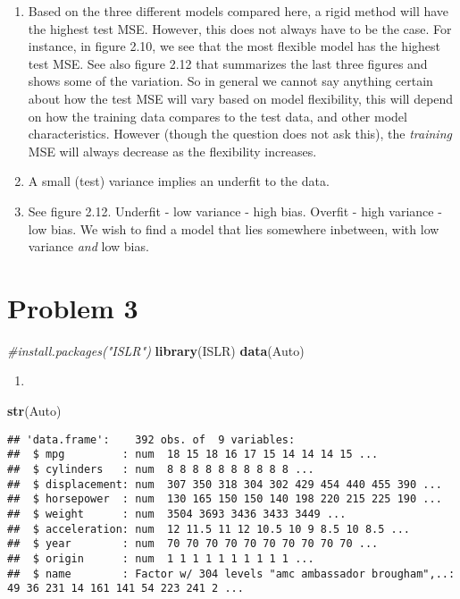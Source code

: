 \documentclass[
]{article}
\newenvironment{Shaded}{\begin{snugshade}}{\end{snugshade}}
\newcommand{\CommentTok}[1]{\textcolor[rgb]{0.56,0.35,0.01}{\textit{#1}}}
\newcommand{\FunctionTok}[1]{\textcolor[rgb]{0.13,0.29,0.53}{\textbf{#1}}}
\newcommand{\NormalTok}[1]{#1}
\providecommand{\tightlist}{%
  \setlength{\itemsep}{0pt}\setlength{\parskip}{0pt}}
\begin{document}
\begin{enumerate}
\def\labelenumi{\alph{enumi})}
\tightlist
\item
  Based on the three different models compared here, a rigid method will
  have the highest test MSE. However, this does not always have to be
  the case. For instance, in figure 2.10, we see that the most flexible
  model has the highest test MSE. See also figure 2.12 that summarizes
  the last three figures and shows some of the variation. So in general
  we cannot say anything certain about how the test MSE will vary based
  on model flexibility, this will depend on how the training data
  compares to the test data, and other model characteristics. However
  (though the question does not ask this), the \emph{training} MSE will
  always decrease as the flexibility increases.
\item
  A small (test) variance implies an underfit to the data.
\item
  See figure 2.12. Underfit - low variance - high bias. Overfit - high
  variance - low bias. We wish to find a model that lies somewhere
  inbetween, with low variance \emph{and} low bias.
\end{enumerate}

\hypertarget{problem-3}{%
\section{Problem 3}\label{problem-3}}

\begin{Shaded}
\begin{Highlighting}[]
\CommentTok{\#install.packages("ISLR")}
\FunctionTok{library}\NormalTok{(ISLR)}
\FunctionTok{data}\NormalTok{(Auto)}
\end{Highlighting}
\end{Shaded}

\begin{enumerate}
\def\labelenumi{\alph{enumi})}
\tightlist
\item
\end{enumerate}

\begin{Shaded}
\begin{Highlighting}[]
\FunctionTok{str}\NormalTok{(Auto)}
\end{Highlighting}
\end{Shaded}

\begin{verbatim}
## 'data.frame':    392 obs. of  9 variables:
##  $ mpg         : num  18 15 18 16 17 15 14 14 14 15 ...
##  $ cylinders   : num  8 8 8 8 8 8 8 8 8 8 ...
##  $ displacement: num  307 350 318 304 302 429 454 440 455 390 ...
##  $ horsepower  : num  130 165 150 150 140 198 220 215 225 190 ...
##  $ weight      : num  3504 3693 3436 3433 3449 ...
##  $ acceleration: num  12 11.5 11 12 10.5 10 9 8.5 10 8.5 ...
##  $ year        : num  70 70 70 70 70 70 70 70 70 70 ...
##  $ origin      : num  1 1 1 1 1 1 1 1 1 1 ...
##  $ name        : Factor w/ 304 levels "amc ambassador brougham",..: 49 36 231 14 161 141 54 223 241 2 ...
\end{verbatim}
\end{document}
